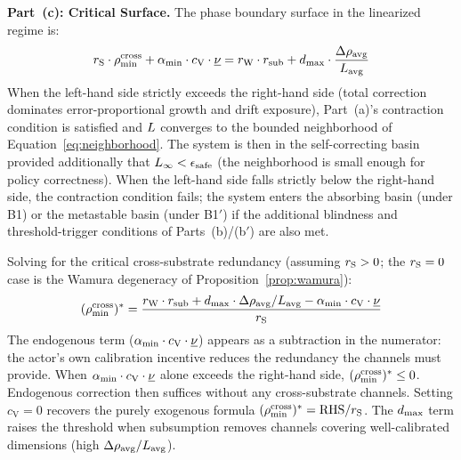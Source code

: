 \begin{theorem}
\medskip
\noindent\textbf{Part~(c): Critical Surface.}
The phase boundary surface in the linearized regime is:
\begin{equation}
\label{eq:critical_surface}
r_{\mathrm{S}} \cdot \rho_{\min}^{\mathrm{cross}} + \alpha_{\min} \cdot c_{\mathrm{V}} \cdot \underline{\nu}
  = r_{\mathrm{W}} \cdot r_{\mathrm{sub}}
  + d_{\mathrm{max}} \cdot \frac{\Delta\rho_{\mathrm{avg}}}{L_{\mathrm{avg}}}
\end{equation}
When the left-hand side strictly exceeds the right-hand side (total
correction dominates error-proportional growth and drift exposure),
Part~(a)'s contraction condition is satisfied and $L$ converges
to the bounded neighborhood of Equation~\ref{eq:neighborhood}.  The
system is then in the self-correcting basin provided additionally
that $L_\infty < \epsilon_{\mathrm{safe}}$ (the neighborhood is
small enough for policy correctness).  When the left-hand side falls
strictly below the right-hand side, the contraction condition fails;
the system enters the absorbing basin (under B1) or the metastable
basin (under B1$'$) if the additional blindness and threshold-trigger
conditions of Parts~(b)/(b$'$) are also met.

Solving for the critical cross-substrate redundancy (assuming
$r_{\mathrm{S}} > 0$; the $r_{\mathrm{S}} = 0$ case is the Wamura degeneracy of
Proposition~\ref{prop:wamura}):
\begin{equation}
\label{eq:critical_redundancy}
(\rho_{\min}^{\mathrm{cross}})^* = \frac{r_{\mathrm{W}} \cdot r_{\mathrm{sub}}
  + d_{\mathrm{max}} \cdot \Delta\rho_{\mathrm{avg}} / L_{\mathrm{avg}}
  - \alpha_{\min} \cdot c_{\mathrm{V}} \cdot \underline{\nu}}
  {r_{\mathrm{S}}}
\end{equation}
The endogenous term ($\alpha_{\min} \cdot c_{\mathrm{V}} \cdot
\underline{\nu}$) appears
as a subtraction in the numerator: the actor's own calibration
incentive reduces the redundancy the channels must provide.  When
$\alpha_{\min} \cdot c_{\mathrm{V}} \cdot \underline{\nu}$ alone exceeds
the right-hand side, $(\rho_{\min}^{\mathrm{cross}})^* \leq 0$.  Endogenous correction
then suffices without any cross-substrate channels.  Setting
$c_{\mathrm{V}} = 0$ recovers the purely exogenous formula
$(\rho_{\min}^{\mathrm{cross}})^* = \mathrm{RHS} / r_{\mathrm{S}}$.  The $d_{\mathrm{max}}$ term raises the
threshold when subsumption removes channels covering well-calibrated
dimensions (high $\Delta\rho_{\mathrm{avg}} / L_{\mathrm{avg}}$).
\end{theorem}

